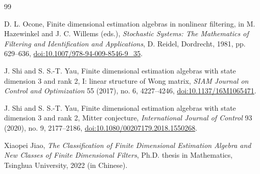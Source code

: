 \documentclass[11pt,a4paper]{article}
\numberwithin{equation}{section}
\theoremstyle{journalplain}
\theoremstyle{journaldef}
\begin{document}
\begin{thebibliography}{99}

D. L. Ocone,
\newblock Finite dimensional estimation algebras in nonlinear filtering,
\newblock in M. Hazewinkel and J. C. Willems (eds.),
\emph{Stochastic Systems: The Mathematics of Filtering and Identification
and Applications}, D. Reidel, Dordrecht, 1981, pp. 629--636,
\href{https://doi.org/10.1007/978-94-009-8546-9_35}
{doi:10.1007/978-94-009-8546-9\_35}.

J. Shi and S. S.-T. Yau,
\newblock Finite dimensional estimation algebras with state dimension 3
and rank 2, I: linear structure of Wong matrix,
\newblock \emph{SIAM Journal on Control and Optimization}
55 (2017), no. 6, 4227--4246,
\href{https://doi.org/10.1137/16M1065471}{doi:10.1137/16M1065471}.

J. Shi and S. S.-T. Yau,
\newblock Finite dimensional estimation algebras with state dimension 3
and rank 2, Mitter conjecture,
\newblock \emph{International Journal of Control}
93 (2020), no. 9, 2177--2186,
\href{https://doi.org/10.1080/00207179.2018.1550268}
{doi:10.1080/00207179.2018.1550268}.

Xiaopei Jiao,
\newblock \emph{The Classification of Finite Dimensional Estimation Algebra
and New Classes of Finite Dimensional Filters},
\newblock Ph.D. thesis in Mathematics, Tsinghua University, 2022
(in Chinese).

\end{thebibliography}
\end{document}
